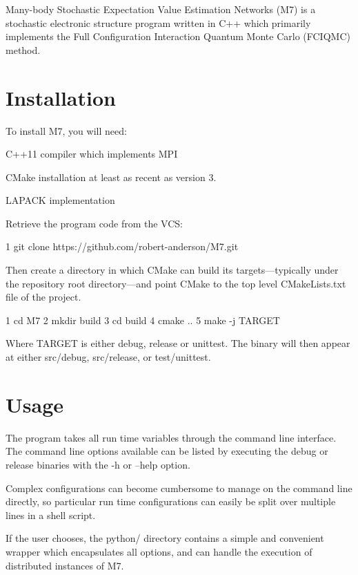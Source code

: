 Many-\/body Stochastic Expectation Value Estimation Networks (M7) is a stochastic electronic structure program written in C++ which primarily implements the Full Configuration Interaction Quantum Monte Carlo (F\+C\+I\+Q\+MC) method.

\section*{Installation}

To install M7, you will need\+:
\begin{DoxyItemize}
\item C++11 compiler which implements M\+PI
\item C\+Make installation at least as recent as version 3.
\item L\+A\+P\+A\+CK implementation
\end{DoxyItemize}

Retrieve the program code from the V\+CS\+: 
\begin{DoxyCode}
1 git clone https://github.com/robert-anderson/M7.git
\end{DoxyCode}
 Then create a directory in which C\+Make can build its targets---typically under the repository root directory---and point C\+Make to the top level C\+Make\+Lists.\+txt file of the project. 
\begin{DoxyCode}
1 cd M7
2 mkdir build
3 cd build
4 cmake ..
5 make -j TARGET
\end{DoxyCode}
 Where T\+A\+R\+G\+ET is either debug, release or unittest. The binary will then appear at either src/debug, src/release, or test/unittest.

\section*{Usage}

The program takes all run time variables through the command line interface. The command line options available can be listed by executing the debug or release binaries with the -\/h or --help option.

Complex configurations can become cumbersome to manage on the command line directly, so particular run time configurations can easily be split over multiple lines in a shell script.

If the user chooses, the python/ directory contains a simple and convenient wrapper which encapsulates all options, and can handle the execution of distributed instances of M7. 